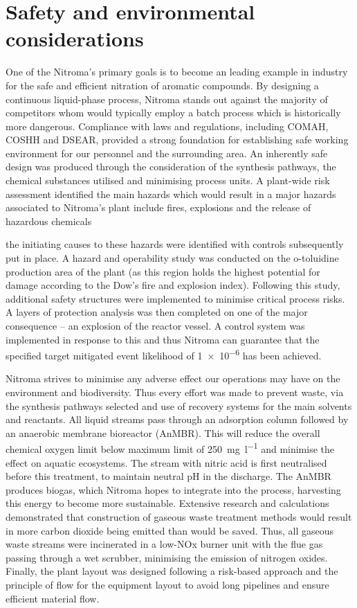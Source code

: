 \section*{Safety and environmental considerations}

 One of the Nitroma's primary goals is to become an leading example in industry for the safe and efficient nitration of aromatic compounds. By designing a continuous liquid-phase process, Nitroma stands out against the majority of competitors whom would typically employ a batch process which is historically more dangerous. Compliance with laws and regulations, including COMAH, COSHH and DSEAR, provided a strong foundation for establishing safe working environment for our personnel and the surrounding area. An inherently safe design was produced through the consideration of the synthesis pathways, the chemical substances utilised and minimising process units. A plant-wide risk assessment identified the main hazards which would result in a major hazards associated to Nitroma's plant include fires, explosions and the release of hazardous chemicals
 
 the initiating causes to these hazards were identified with controls subsequently put in place. A hazard and operability study was conducted on the o-toluidine production area of the plant (as this region holds the highest potential for damage according to the Dow's fire and explosion index). Following this study, additional safety structures were implemented to minimise critical process risks. A layers of protection analysis was then completed on one of the major consequence – an explosion of the reactor vessel. A control system was implemented in response to this and thus Nitroma can guarantee that the specified target mitigated event likelihood of \num{1e-6} has been achieved.

Nitroma strives to minimise any adverse effect our operations may have on the environment and biodiversity. Thus every effort was made to prevent waste, via the synthesis pathways selected and use of recovery systems for the main solvents and reactants. All liquid streams pass through an adsorption column followed by an anaerobic membrane bioreactor (AnMBR). This will reduce the overall chemical oxygen limit below maximum limit of \SI{250}{\mg\per\litre} and minimise the effect on aquatic ecosystems. The stream with nitric acid is first neutralised before this treatment, to maintain neutral pH in the discharge. The AnMBR produces biogas, which Nitroma hopes to integrate into the process, harvesting this energy to become more sustainable.  Extensive research and calculations demonstrated that construction of gaseous waste treatment methods would result in more carbon dioxide being emitted than would be saved. Thus, all gaseous waste streams were incinerated in a low-NOx burner unit with the flue gas passing through a wet scrubber, minimising the emission of nitrogen oxides. Finally, the plant layout was designed following a risk-based approach and the principle of flow for the equipment layout to avoid long pipelines and ensure efficient material flow. 